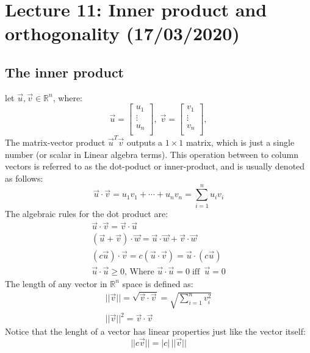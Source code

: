 \documentclass[11pt, a4paper]{article}
\newcommand*{\R}{\ensuremath{\mathbb{R}}}
\begin{document}
\setcounter{section}{10}
\section{Lecture 11: Inner product and orthogonality (17/03/2020)}
\subsection{The inner product}
let $\vec{u}, \vec{v} \in \R^n$, where:
\begin{equation*}
  \vec{u} = \begin{bmatrix} u_1 \\ \vdots \\ u_n \\\end{bmatrix},\;
    \vec{v} = \begin{bmatrix} v_1 \\ \vdots \\ v_n \\\end{bmatrix},
\end{equation*}
The matrix-vector product $\vec{u}^T\vec{v}$ outputs a $1 \times 1$ matrix, which
is just a single number (or scalar in Linear algebra terms). This operation between to column vectors is referred to as the dot-poduct or inner-product, and is usually denoted as follows:
\begin{equation}
  \vec{u} \cdot \vec{v} = u_1v_1 + \cdots + u_nv_n = \sum_{i=1}^n u_iv_i
\end{equation}
The algebraic rules for the dot product are:
\begin{gather}
  \vec{u} \cdot \vec{v} = \vec{v} \cdot \vec{u}\\
  (\vec{u} + \vec{v}) \cdot \vec{w} = \vec{u} \cdot \vec{w} + \vec{v} \cdot \vec{w}\\
  (c\vec{u}) \cdot \vec{v} = c(\vec{u} \cdot \vec{v}) = \vec{u} \cdot (c\vec{u})\\
  \vec{u} \cdot \vec{u} \geq 0, \, \text{Where } \vec{u} \cdot \vec{u} = 0 \; \text{iff }\, \vec{u} = 0
\end{gather}
The length of any vector in $\R^n$ space is defined as:
\begin{gather}
  ||\vec{v}|| = \sqrt{\vec{v} \cdot \vec{v}} = \sqrt{\sum_{i=1}^n v_i^2}\\
  ||\vec{v}||^2 = \vec{v} \cdot \vec{v}
\end{gather}
Notice that the lenght of a vector has linear properties just like the vector itself:
\begin{equation}
  ||c\vec{v}|| = |c|\,||\vec{v}||
\end{equation}
\end{document}

